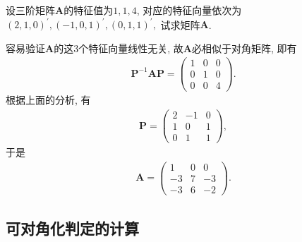 \documentclass[../../main.tex]{subfiles}
\begin{document}
\begin{example}
设三阶矩阵\(\boldsymbol{A}\)的特征值为\(1,1,4\), 对应的特征向量依次为
\((2,1,0)^{\prime},(-1,0,1)^{\prime},(0,1,1)^{\prime},\)
试求矩阵\(\boldsymbol{A}\).
\end{example}
\begin{solution}
容易验证\(\boldsymbol{A}\)的这\(3\)个特征向量线性无关, 故\(\boldsymbol{A}\)必相似于对角矩阵, 即有
\begin{align*}
\boldsymbol{P}^{-1}\boldsymbol{AP}=\begin{pmatrix}
1&0&0\\
0&1&0\\
0&0&4
\end{pmatrix}.
\end{align*}
根据上面的分析, 有
\begin{align*}
\boldsymbol{P}=\begin{pmatrix}
2&-1&0\\
1&0&1\\
0&1&1
\end{pmatrix},
\end{align*}
于是
\begin{align*}
\boldsymbol{A}=\begin{pmatrix}
1&0&0\\
-3&7&-3\\
-3&6&-2
\end{pmatrix}. 
\end{align*} 

\end{solution}

\subsection{可对角化判定的计算}
\end{document}
